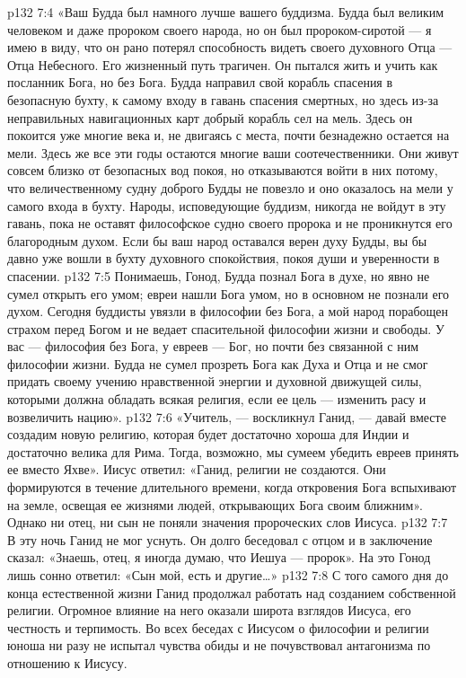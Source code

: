 \vs p132 7:4 «Ваш Будда был намного лучше вашего буддизма. Будда был великим человеком и даже пророком своего народа, но он был пророком\hyp{}сиротой --- я имею в виду, что он рано потерял способность видеть своего духовного Отца --- Отца Небесного. Его жизненный путь трагичен. Он пытался жить и учить как посланник Бога, но без Бога. Будда направил свой корабль спасения в безопасную бухту, к самому входу в гавань спасения смертных, но здесь из\hyp{}за неправильных навигационных карт добрый корабль сел на мель. Здесь он покоится уже многие века и, не двигаясь с места, почти безнадежно остается на мели. Здесь же все эти годы остаются многие ваши соотечественники. Они живут совсем близко от безопасных вод покоя, но отказываются войти в них потому, что величественному судну доброго Будды не повезло и оно оказалось на мели у самого входа в бухту. Народы, исповедующие буддизм, никогда не войдут в эту гавань, пока не оставят философское судно своего пророка и не проникнутся его благородным духом. Если бы ваш народ оставался верен духу Будды, вы бы давно уже вошли в бухту духовного спокойствия, покоя души и уверенности в спасении.
\vs p132 7:5 Понимаешь, Гонод, Будда познал Бога в духе, но явно не сумел открыть его умом; евреи нашли Бога умом, но в основном не познали его духом. Сегодня буддисты увязли в философии без Бога, а мой народ порабощен страхом перед Богом и не ведает спасительной философии жизни и свободы. У вас --- философия без Бога, у евреев --- Бог, но почти без связанной с ним философии жизни. Будда не сумел прозреть Бога как Духа и Отца и не смог придать своему учению нравственной энергии и духовной движущей силы, которыми должна обладать всякая религия, если ее цель --- изменить расу и возвеличить нацию».
\vs p132 7:6 «Учитель, --- воскликнул Ганид, --- давай вместе создадим новую религию, которая будет достаточно хороша для Индии и достаточно велика для Рима. Тогда, возможно, мы сумеем убедить евреев принять ее вместо Яхве». Иисус ответил: «Ганид, религии не создаются. Они формируются в течение длительного времени, когда откровения Бога вспыхивают на земле, освещая ее жизнями людей, открывающих Бога своим ближним». Однако ни отец, ни сын не поняли значения пророческих слов Иисуса.
\vs p132 7:7 \pc В эту ночь Ганид не мог уснуть. Он долго беседовал с отцом и в заключение сказал: «Знаешь, отец, я иногда думаю, что Иешуа --- пророк». На это Гонод лишь сонно ответил: «Сын мой, есть и другие\ldots »
\vs p132 7:8 С того самого дня до конца естественной жизни Ганид продолжал работать над созданием собственной религии. Огромное влияние на него оказали широта взглядов Иисуса, его честность и терпимость. Во всех беседах с Иисусом о философии и религии юноша ни разу не испытал чувства обиды и не почувствовал антагонизма по отношению к Иисусу.
